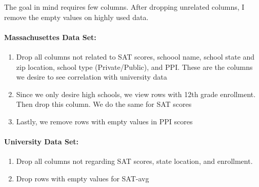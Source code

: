 \documentclass[11pt]{article}
\providecommand{\tightlist}{%
      \setlength{\itemsep}{0pt}\setlength{\parskip}{0pt}}
\begin{document}
The goal in mind requires few columns. After dropping unrelated columns,
I remove the empty values on highly used data.

\paragraph{Massachusettes Data Set:}\label{massachusettes-data-set}

\begin{enumerate}
\def\labelenumi{\arabic{enumi}.}
\tightlist
\item
  Drop all columns not related to SAT scores, schoool name, school state
  and zip location, school type (Private/Public), and PPI. These are the
  columns we desire to see correlation with university data
\item
  Since we only desire high schools, we view rows with 12th grade
  enrollment. Then drop this column. We do the same for SAT scores
\item
  Lastly, we remove rows with empty values in PPI scores
\end{enumerate}

\paragraph{University Data Set:}\label{university-data-set}

\begin{enumerate}
\def\labelenumi{\arabic{enumi}.}
\tightlist
\item
  Drop all columns not regarding SAT scores, state location, and
  enrollment.\\
\item
  Drop rows with empty values for SAT-avg
\end{enumerate}
\end{document}
